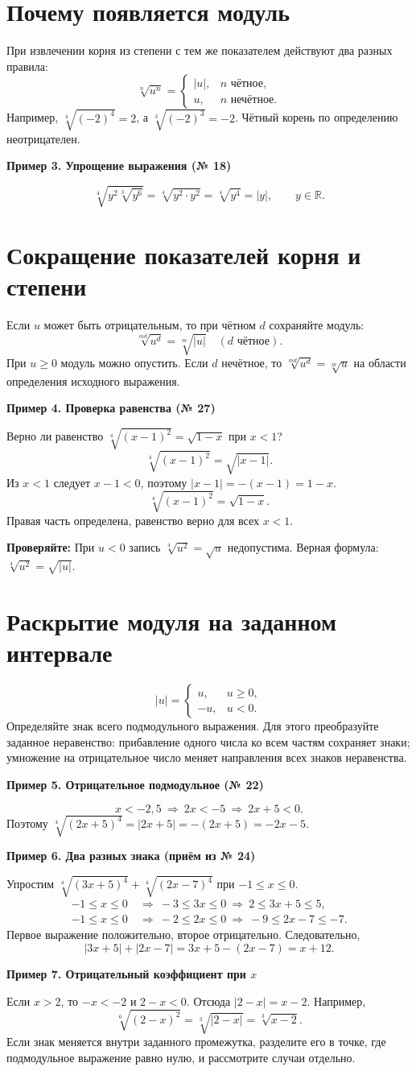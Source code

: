 \documentclass[a4paper,12pt]{article}
\newcommand{\example}[1]{\par\medskip\textcolor{darkaccent}{\textbf{#1}}\par}
\newcommand{\abs}[1]{\left|#1\right|}
\newcommand{\remember}[1]{\par\smallskip\textcolor{darkaccent}{\textbf{Проверяйте:}} #1\par}
\begin{document}
\section{Почему появляется модуль}
При извлечении корня из степени с тем же показателем действуют два разных правила:
\[
\sqrt[n]{u^n}=\begin{cases}
\abs{u},& n\text{ чётное},\\
u,& n\text{ нечётное}.
\end{cases}
\]
Например, $\sqrt[4]{(-2)^4}=2$, а $\sqrt[3]{(-2)^3}=-2$. Чётный корень по определению неотрицателен.
\example{Пример 3. Упрощение выражения (№ 18)}
\[
\sqrt[4]{y^2\sqrt[3]{y^6}}
=\sqrt[4]{y^2\cdot y^2}
=\sqrt[4]{y^4}=\abs{y},\qquad y\in\mathbb R.
\]
\section{Сокращение показателей корня и степени}
Если $u$ может быть отрицательным, то при чётном $d$ сохраняйте модуль:
\[
\sqrt[md]{u^d}=\sqrt[m]{\abs{u}}\quad(d\text{ чётное}).
\]
При $u\ge0$ модуль можно опустить. Если $d$ нечётное, то $\sqrt[md]{u^d}=\sqrt[m]{u}$ на области определения исходного выражения.
\example{Пример 4. Проверка равенства (№ 27)}
Верно ли равенство $\sqrt[4]{(x-1)^2}=\sqrt{1-x}$ при $x<1$?
\[
\sqrt[4]{(x-1)^2}=\sqrt{\abs{x-1}}.
\]
Из $x<1$ следует $x-1<0$, поэтому $\abs{x-1}=-(x-1)=1-x$.
\[
\sqrt[4]{(x-1)^2}=\sqrt{1-x}.
\]
Правая часть определена, равенство верно для всех $x<1$.
\remember{При $u<0$ запись $\sqrt[4]{u^2}=\sqrt{u}$ недопустима. Верная формула: $\sqrt[4]{u^2}=\sqrt{\abs{u}}$.}
\clearpage
\section{Раскрытие модуля на заданном интервале}
\[
\abs{u}=\begin{cases}u,&u\ge0,\\-u,&u<0.\end{cases}
\]
Определяйте знак всего подмодульного выражения. Для этого преобразуйте заданное неравенство: прибавление одного числа ко всем частям сохраняет знаки; умножение на отрицательное число меняет направления всех знаков неравенства.
\example{Пример 5. Отрицательное подмодульное (№ 22)}
\[
 x<-2{,}5\ \Longrightarrow\ 2x<-5\ \Longrightarrow\ 2x+5<0.
\]
Поэтому $\sqrt[4]{(2x+5)^4}=\abs{2x+5}=-(2x+5)=-2x-5$.
\example{Пример 6. Два разных знака (приём из № 24)}
Упростим $\sqrt[4]{(3x+5)^4}+\sqrt[4]{(2x-7)^4}$ при $-1\le x\le0$.
\[
\begin{aligned}
-1\le x\le0&\ \Rightarrow\ -3\le3x\le0\ \Rightarrow\ 2\le3x+5\le5,\\
-1\le x\le0&\ \Rightarrow\ -2\le2x\le0\ \Rightarrow\ -9\le2x-7\le-7.
\end{aligned}
\]
Первое выражение положительно, второе отрицательно. Следовательно,
\[
\abs{3x+5}+\abs{2x-7}=3x+5-(2x-7)=x+12.
\]
\example{Пример 7. Отрицательный коэффициент при $x$}
Если $x>2$, то $-x<-2$ и $2-x<0$. Отсюда $\abs{2-x}=x-2$. Например,
\[
\sqrt[6]{(2-x)^2}=\sqrt[3]{\abs{2-x}}=\sqrt[3]{x-2}.
\]
Если знак меняется внутри заданного промежутка, разделите его в точке, где подмодульное выражение равно нулю, и рассмотрите случаи отдельно.
\clearpage
\end{document}
